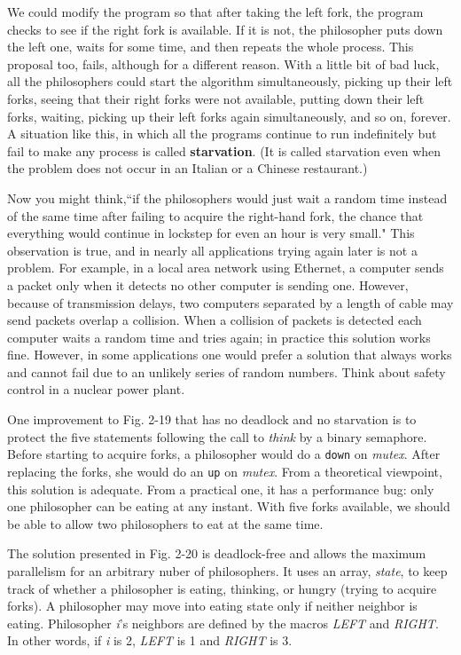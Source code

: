 \documentclass{book}
\newcommand {\kw}  [1] {\textbf{#1}}
\newcommand {\sys} [1] {\textsl{#1}}
\newcommand {\cmd} [1] {\texttt{#1}}
\begin{document}
We could modify the program so that after taking the left fork, the program checks to see if the right fork is available.
If it is not, the philosopher puts down the left one, waits for some time, and then repeats the whole process.
This proposal too, fails, although for a different reason.
With a little bit of bad luck, all the philosophers could start the algorithm simultaneously, 
picking up their left forks, seeing that their right forks were not available, putting down their left forks, waiting, 
picking up their left forks again simultaneously, and so on, forever.
A situation like this, in which all the programs continue to run indefinitely but fail to make any process is called \kw{starvation}.
(It is called starvation even when the problem does not occur in an Italian or a Chinese restaurant.)

Now you might think,``if the philosophers would just wait a random time instead of the same time after failing to acquire the right-hand fork,
the chance that everything would continue in lockstep for even an hour is very small."
This observation is true, and in nearly all applications trying again later is not a problem.
For example, in a local area network using Ethernet, a computer sends a packet only when it detects no other computer is sending one.
However, because of transmission delays, two computers separated by a length of cable may send packets overlap a collision. 
When a collision of packets is detected each computer waits a random time and tries again;
in practice this solution works fine.
However, in some applications one would prefer a solution that always works and cannot fail due to an unlikely series of random numbers.
Think about safety control in a nuclear power plant.

One improvement to Fig. 2-19 that has no deadlock and no starvation is to 
protect the five statements following the call to \sys{think} by a binary semaphore.
Before starting to acquire forks, a philosopher would do a \cmd{down} on \sys{mutex}.
After replacing the forks, she would do an \cmd{up} on \sys{mutex}.
From a theoretical viewpoint, this solution is adequate.
From a practical one, it has a performance bug: only one philosopher can be eating at any instant.
With five forks available, we should be able to allow two philosophers to eat at the same time.

The solution presented in Fig. 2-20 is deadlock-free and allows the maximum parallelism for an arbitrary nuber of philosophers.
It uses an array, \sys{state}, to keep track of whether a philosopher is eating, thinking, or hungry (trying to acquire forks).
A philosopher may move into eating state only if neither neighbor is eating.
Philosopher \sys{i}'s neighbors are defined by the macros \sys{LEFT} and \sys{RIGHT}.
In other words, if \sys{i} is 2, \sys{LEFT} is 1 and \sys{RIGHT} is 3.
\end{document}
